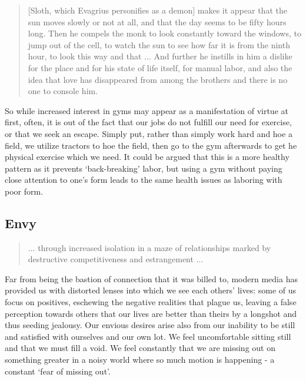 \documentclass[letterpaper]{article}
\begin{document}
\begin{quote}
  [Sloth, which Evagrius personifies as a demon] makes it appear that the sun moves slowly or not at all, and that the day seems to be fifty hours long. Then he compels the monk to look constantly toward the windows, to jump out of the cell, to watch the sun to see how far it is from the ninth hour, to look this way and that ... And further he instills in him a dislike for the place and for his state of life itself, for manual labor, and also the idea that love has disappeared from among the brothers and there is no one to console him.
\end{quote}

So while increased interest in gyms may appear as a manifestation of virtue at first, often, it is out of the fact that our jobs do not fulfill our need for exercise, or that we seek an escape. Simply put, rather than simply work hard and hoe a field, we utilize tractors to hoe the field, then go to the gym afterwards to get he physical exercise which we need. It could be argued that this is a more healthy pattern as it prevents `back-breaking' labor, but using a gym without paying close attention to one's form leads to the same health issues as laboring with poor form.

\subsection{Envy}

\begin{quote}
  ... through increased isolation in a maze of relationships marked by destructive competitiveness and estrangement ...
\end{quote}

Far from being the bastion of connection that it was billed to, modern media has provided us with distorted lenses into which we see each others' lives: some of us focus on positives, eschewing the negative realities that plague us, leaving a false perception towards others that our lives are better than theirs by a longshot and thus seeding jealousy. Our envious desires arise also from our inability to be still and satisfied with ourselves and our own lot. We feel uncomfortable sitting still and that we must fill a void. We feel constantly that we are missing out on something greater in a noisy world where so much motion is happening - a constant `fear of missing out'.
\end{document}
